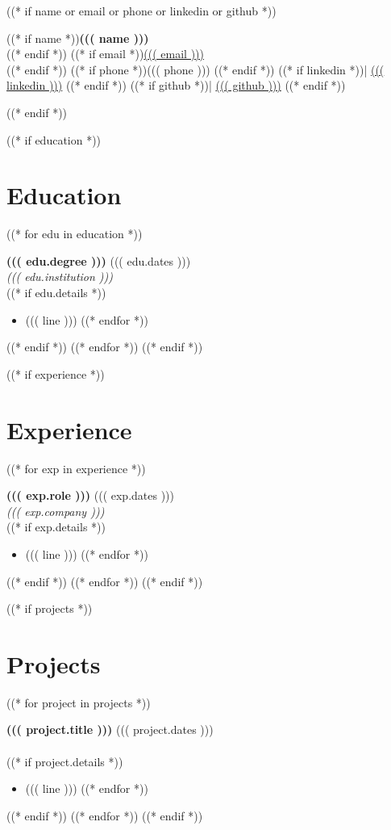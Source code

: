 \documentclass[a4paper,10pt]{article}
\newcommand{\resumeItem}[1]{\item #1}
\newcommand{\resumeSubheading}[4]{
  \textbf{#1} \hfill #2 \\
  \textit{#3} \hfill \textit{#4} \\
}
\begin{document}
((* if name or email or phone or linkedin or github *))
\begin{center}
  ((* if name *)){\Huge \textbf{((( name )))}}\\ ((* endif *))
  ((* if email *))\href{mailto:((( email )))}{((( email )))} \\ ((* endif *))
  ((* if phone *))((( phone ))) ((* endif *))
  ((* if linkedin *))\quad | \quad \href{https://((( linkedin )))}{((( linkedin )))} ((* endif *))
  ((* if github *))\quad | \quad \href{https://((( github )))}{((( github )))} ((* endif *))
\end{center}
((* endif *))

((* if education *))
\section*{Education}
((* for edu in education *))
\resumeSubheading
  { ((( edu.degree ))) }
  { ((( edu.dates ))) }
  { ((( edu.institution ))) }
  { }
((* if edu.details *))
\begin{itemize}[leftmargin=0.15in]
  ((* for line in edu.details *))
  \resumeItem{ ((( line ))) }
  ((* endfor *))
\end{itemize}
((* endif *))
((* endfor *))
((* endif *))

((* if experience *))
\section*{Experience}
((* for exp in experience *))
\resumeSubheading
  { ((( exp.role ))) }
  { ((( exp.dates ))) }
  { ((( exp.company ))) }
  { }
((* if exp.details *))
\begin{itemize}[leftmargin=0.15in]
  ((* for line in exp.details *))
  \resumeItem{ ((( line ))) }
  ((* endfor *))
\end{itemize}
((* endif *))
((* endfor *))
((* endif *))

((* if projects *))
\section*{Projects}
((* for project in projects *))
\resumeSubheading
  { ((( project.title ))) }
  { ((( project.dates ))) }
  { }
  { }
((* if project.details *))
\begin{itemize}[leftmargin=0.15in]
  ((* for line in project.details *))
  \resumeItem{ ((( line ))) }
  ((* endfor *))
\end{itemize}
((* endif *))
((* endfor *))
((* endif *))
\end{document}
